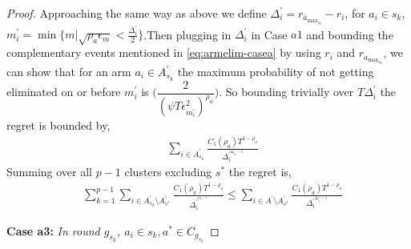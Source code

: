 \begin{proof}
Approaching the same way as above we define $\Delta_{i}^{'}=r_{a_{\max_{s_{k}}}} - r_{i}$, for $a_{i}\in s_{k}$, $m_{i}^{'}=\min{\lbrace m|\sqrt{\rho_{a}\epsilon_{m}} < \frac{\Delta_{i}^{'}}{2} \rbrace}$.Then plugging in $\Delta^{'}_{i}$ in Case $a1$ and bounding the complementary events mentioned in \ref{eq:armelim-casea} by using $r_{i}$ and $r_{a_{\max_{s_{k}}}}$, we can show that for an arm $a_{i}\in A_{s_{k}}^{'}$ the maximum probability of not getting eliminated on or before $m_{i}^{'}$ is  $\bigg(\dfrac{2}{(\psi T\epsilon_{m_{i}^{'}}^{2})^{\rho_{a}}}\bigg)$. So bounding trivially over $T\Delta_{i}^{'}$ the regret is bounded by,
\begin{align*}
& \sum_{i\in A_{s_{k}}^{'}}\frac{C_{1}(\rho_{a})T^{1-\rho_{a}}}{\Delta_{i}^{'^{{4\rho_{a}-1}}}} 
   \end{align*}
Summing over all $p-1$ clusters excluding $s^{*}$ the regret is,
\begin{align*}
& \sum_{k=1}^{p-1}\sum_{i\in A_{s_{k}}^{'}\setminus A_{s^{*}}^{'}} \frac{C_{1}(\rho_{a})T^{1-\rho_{a}}}{\Delta_{i}^{'^{^{4\rho_{a}-1}}}} \leq \sum_{i\in A^{'}\setminus A^{'}_{s^{*}}}\frac{C_{1}(\rho_{a})T^{1-\rho_{a}}}{\Delta_{i}^{'^{4\rho_{a}-1}}} 
   \end{align*}
   




\textbf{Case a3:} \textit{In round $g_{s_{k}}$, $a_{i}\in s_{k}, a^{*}\in C_{g_{s_{k}}}$} 


\end{proof}
